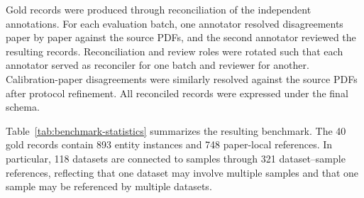 Gold records were produced through reconciliation of the independent
annotations. For each evaluation batch, one annotator resolved disagreements
paper by paper against the source PDFs, and the second annotator reviewed the
resulting records. Reconciliation and review roles were rotated such that each
annotator served as reconciler for one batch and reviewer for another.
Calibration-paper disagreements were similarly resolved against the source
PDFs after protocol refinement. All reconciled records were expressed under
the final schema.

Table~\ref{tab:benchmark-statistics} summarizes the resulting benchmark. The 40
gold records contain 893 entity instances and 748 paper-local
references. In particular, 118 datasets are connected to samples through
321 dataset--sample references, reflecting that one dataset may involve
multiple samples and that one sample may be referenced by multiple datasets.
